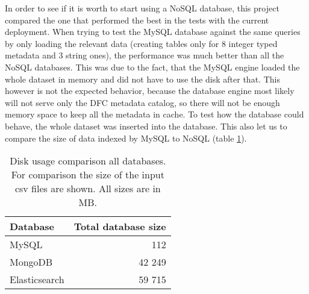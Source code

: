 
In order to see if it is worth to start using a NoSQL database, this project compared the one that performed 
the best in the tests with the current deployment. When trying to test the MySQL database against the same queries 
by only loading the relevant data (creating tables only for 8 integer typed metadata and 3 string ones), the 
performance was much better than all the NoSQL databases. This was due to the fact, that the MySQL engine loaded
the whole dataset in memory and did not have to use the disk after that. This however is not the expected 
behavior, because the database engine most likely will not serve only the DFC metadata catalog, so there will not
be enough memory space to keep all the metadata in cache. To test how the database could behave, the whole dataset
was inserted into the database. This also let us to compare the size of data indexed by MySQL to NoSQL (table 
\ref{tab:allDbSizes}). 

\begin{table}[h]
\centering
\label{tab:allDbSizes}
\begin{tabular}{|l|r|}
\hline
Database      & \multicolumn{1}{l|}{Total database size} \\ \hline
MySQL         & 112                                 \\ \hline %
MongoDB       & 42 249                                   \\ \hline
Elasticsearch & 59 715                                   \\ \hline
\end{tabular}
\caption{Disk usage comparison all databases. For comparison the size of the input csv files are shown. All sizes 
are in MB.}
\end{table}

